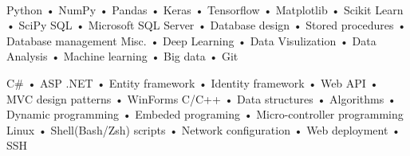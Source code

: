 \\
\begin{minipage}[t]{0.48\linewidth}
\begin{cvskills}
\cvskill
{Python}
{• NumPy • Pandas • Keras • Tensorflow • Matplotlib • Scikit Learn • SciPy}
\cvskill
{SQL}
{• Microsoft SQL Server • Database design • Stored procedures • Database management}
\cvskill
{Misc.} %
{• Deep Learning • Data Visulization • Data Analysis • Machine learning • Big data • Git} %
\end{cvskills}
\end{minipage}
\hspace{0.04\linewidth}
\begin{minipage}[t]{0.48\linewidth}
\begin{cvskills}
\cvskill
{C\#} %
{• ASP .NET • Entity framework • Identity framework • Web API • MVC design patterns • WinForms} %
  \cvskill
  {C/C++}
  {• Data structures • Algorithms • Dynamic programming • Embeded programing • Micro-controller programming}
  \cvskill
  {Linux}
  {• Shell(Bash/Zsh) scripts • Network configuration • Web deployment • SSH}
\end{cvskills}
\end{minipage}%
\vspace{3mm}\\
